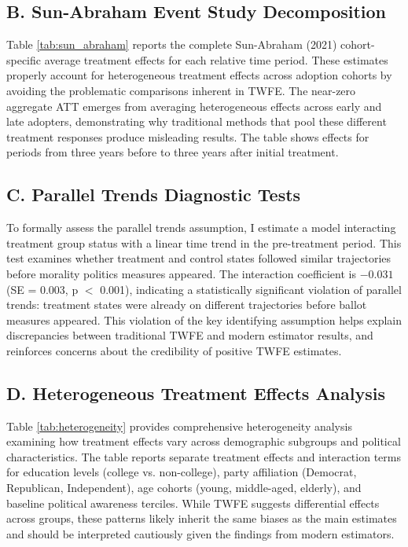 \documentclass[12pt,letterpaper,oneside]{book}
\newcommand{\basepath}{g:/My Drive/Grad School}
\newcommand{\basepath}{basepath}
\begin{document}
\subsection*{B. Sun-Abraham Event Study Decomposition}

Table \ref{tab:sun_abraham} reports the complete Sun-Abraham (2021) cohort-specific average treatment effects for each relative time period. These estimates properly account for heterogeneous treatment effects across adoption cohorts by avoiding the problematic comparisons inherent in TWFE. The near-zero aggregate ATT emerges from averaging heterogeneous effects across early and late adopters, demonstrating why traditional methods that pool these different treatment responses produce misleading results. The table shows effects for periods from three years before to three years after initial treatment.


\label{tab:sun_abraham}

\subsection*{C. Parallel Trends Diagnostic Tests}

To formally assess the parallel trends assumption, I estimate a model interacting treatment group status with a linear time trend in the pre-treatment period. This test examines whether treatment and control states followed similar trajectories before morality politics measures appeared. The interaction coefficient is $-0.031$ (SE = 0.003, p $<$ 0.001), indicating a statistically significant violation of parallel trends: treatment states were already on different trajectories before ballot measures appeared. This violation of the key identifying assumption helps explain discrepancies between traditional TWFE and modern estimator results, and reinforces concerns about the credibility of positive TWFE estimates.

\subsection*{D. Heterogeneous Treatment Effects Analysis}

Table \ref{tab:heterogeneity} provides comprehensive heterogeneity analysis examining how treatment effects vary across demographic subgroups and political characteristics. The table reports separate treatment effects and interaction terms for education levels (college vs. non-college), party affiliation (Democrat, Republican, Independent), age cohorts (young, middle-aged, elderly), and baseline political awareness terciles. While TWFE suggests differential effects across groups, these patterns likely inherit the same biases as the main estimates and should be interpreted cautiously given the findings from modern estimators.
\end{document}
